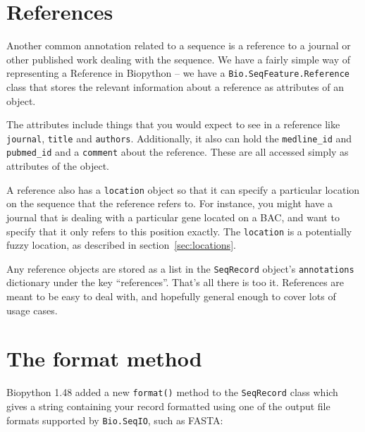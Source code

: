 \documentclass{report}
\begin{document}
\section{References}

Another common annotation related to a sequence is a reference to a journal or other published work dealing with the sequence. We have a fairly simple way of representing a Reference in Biopython -- we have a \verb|Bio.SeqFeature.Reference| class that stores the relevant information about a reference as attributes of an object.

The attributes include things that you would expect to see in a reference like \verb|journal|, \verb|title| and \verb|authors|. Additionally, it also can hold the \verb|medline_id| and \verb|pubmed_id| and a \verb|comment| about the reference. These are all accessed simply as attributes of the object.

A reference also has a \verb|location| object so that it can specify a particular location on the sequence that the reference refers to. For instance, you might have a journal that is dealing with a particular gene located on a BAC, and want to specify that it only refers to this position exactly. The \verb|location| is a potentially fuzzy location, as described in section~\ref{sec:locations}.

Any reference objects are stored as a list in the \verb|SeqRecord| object's \verb|annotations| dictionary under the key ``references''.
That's all there is too it. References are meant to be easy to deal with, and hopefully general enough to cover lots of usage cases.

\section{The format method}
\label{sec:SeqRecord-format}

Biopython 1.48 added a new \verb|format()| method to the \verb|SeqRecord| class which
gives a string containing your record formatted using one of the output file formats
supported by \verb|Bio.SeqIO|, such as FASTA:
\end{document}
